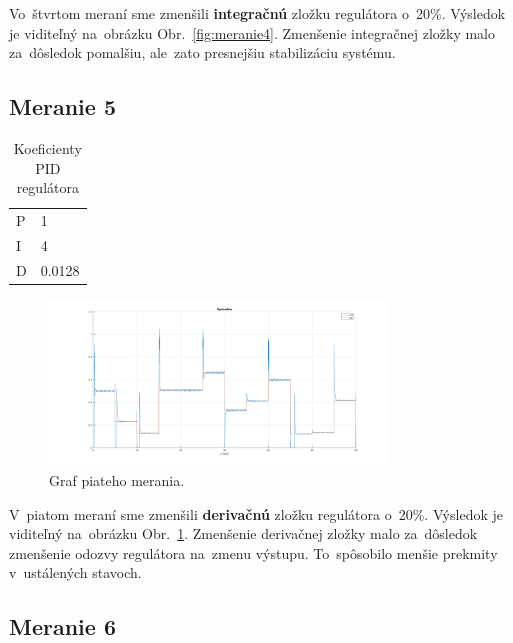 \documentclass{article}
\begin{document}
Vo~štvrtom meraní sme zmenšili \textbf{integračnú} zložku regulátora o~20\%. Výsledok je viditeľný
na~obrázku Obr.~\ref{fig:meranie4}. Zmenšenie integračnej zložky malo za~dôsledok pomalšiu, ale~zato
presnejšiu stabilizáciu systému.

\clearpage

\subsection{Meranie 5}
\label{sec:meranie5}

\begin{table}[!htbp]
	\caption{Koeficienty PID regulátora}
	\label{tab:t5}
	\begin{center}
		\begin{tabular}[c]{|l|l|}
			\hline
			P & 1 \\
			I & 4 \\
			D & 0.0128 \\
			\hline
		\end{tabular}
	\end{center}
\end{table}

\begin{figure}[!htbp]
	\begin{center}
		\includegraphics[width=0.8\textwidth]{./include/m5.png}
	\end{center}
	\caption{Graf piateho merania.}
	\label{fig:meranie5}
\end{figure}

V~piatom meraní sme zmenšili \textbf{derivačnú} zložku regulátora o~20\%. Výsledok je viditeľný
na~obrázku Obr.~\ref{fig:meranie5}. Zmenšenie derivačnej zložky malo za~dôsledok zmenšenie odozvy
regulátora na~zmenu výstupu. To~spôsobilo menšie prekmity v~ustálených stavoch.

\clearpage

\subsection{Meranie 6}
\label{sec:meranie6}
\end{document}
